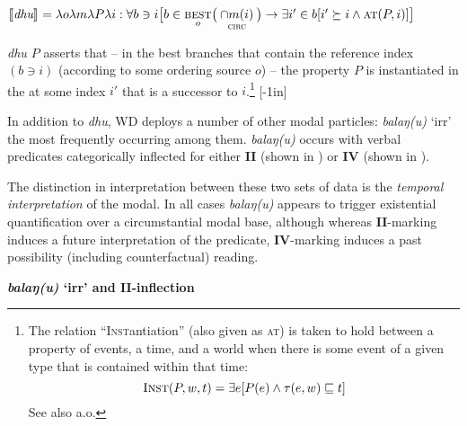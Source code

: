 \pex {}$ \llbracket{\textit{dhu}}\rrbracket^{}=\lambda o\lambda m\lambda P\lambda i:\forall b\ni i\big[b\in\underset{o}{\textsc{best}}\big(\underset{\textsc{circ}}{\cap m(i)}\big)\to\exists i'\in b[i'\succeq i\wedge \textsc{at}(P,i)]\big] $

\textit{dhu $ P $} %
 asserts that -- in the best branches that contain the reference index $ (b\ni i) $ (according to some ordering source $ o $) -- the property $ P $ is instantiated in the at some index $ i' $ that is a successor to $ i $.\footnote{The relation ``\textsc{Inst}antiation'' (also given as \textsc{at}) is taken to hold between a property of events, a time, and a world when there is some event of a given type that is contained within that time: $$ \textsc{Inst}(P,w,t)=\exists e[P(e)\wedge\tau(e,w)\sqsubseteq t] $$ See also \citet{Condoravdi2003,Condoravdi2014} a.o.}
\xe{}[-1in]


In addition to \textit{dhu}, WD deploys a number of other modal particles: \textit{balaŋ(u)} `\gls{irr}' the most frequently occurring among them. \textit{balaŋ(u)} occurs with verbal predicates categorically inflected for either \textbf{II} (shown in ) or \textbf{IV} (shown in ).

The distinction in interpretation between these two sets of data is the \textit{temporal interpretation} of the modal. In all cases \textit{balaŋ(u)} appears to trigger existential quantification over a circumstantial modal base, although whereas \textbf{II}-marking induces a future interpretation of the predicate, \textbf{IV}-marking induces a past possibility (including counterfactual) reading.

\pex \textbf{\textit{balaŋ(u)} `\gls{irr}' and \textbf{II}-inflection}


